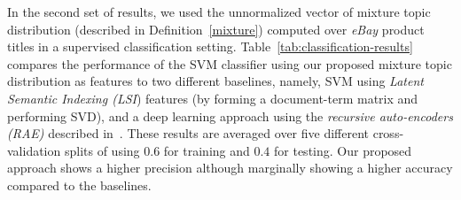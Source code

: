 \documentclass{article} %
\begin{document}
In the second set of results, we used the unnormalized vector of mixture topic
distribution (described in Definition~\ref{mixture}) computed over {\em eBay} product titles in a supervised classification setting. Table~\ref{tab:classification-results} compares the performance of the SVM classifier using our proposed mixture topic distribution as features to two different baselines, namely, SVM using {\em Latent Semantic Indexing (LSI}) features (by forming a document-term matrix and performing SVD), and a deep learning approach using the {\em recursive auto-encoders (RAE)} described in~\cite{Socher:2011:SRA:2145432.2145450}. These results are averaged over five different cross-validation splits of using $0.6$ for training and $0.4$ for testing. Our proposed approach shows a higher precision although marginally showing a higher accuracy compared to the baselines.
\end{document}
